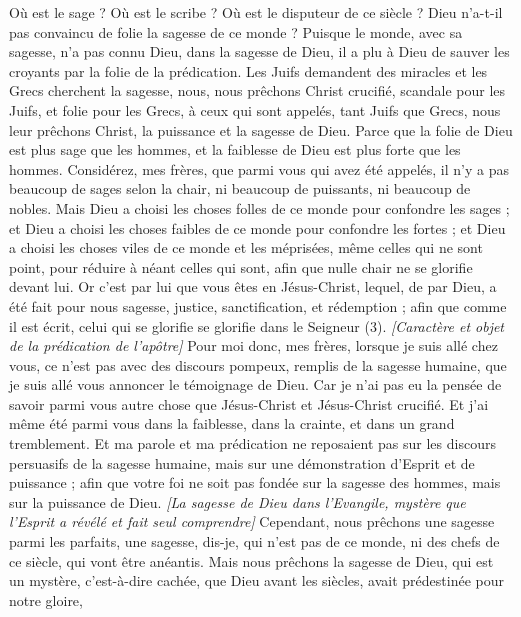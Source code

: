 \begin{multicols}{2}
Où est le sage ? Où est le scribe ? Où est le disputeur de ce siècle ? Dieu n'a-t-il pas convaincu de folie la sagesse de ce monde ?
Puisque le monde, avec sa sagesse, n’a pas connu Dieu, dans la sagesse de Dieu, il a plu à Dieu de sauver les croyants par la folie de la prédication.
Les Juifs demandent des miracles et les Grecs cherchent la sagesse,
nous, nous prêchons Christ crucifié, scandale pour les Juifs, et folie pour les Grecs,
à ceux qui sont appelés, tant Juifs que Grecs, nous leur prêchons Christ, la puissance et la sagesse de Dieu.
Parce que la folie de Dieu est plus sage que les hommes, et la faiblesse de Dieu est plus forte que les hommes.
Considérez, mes frères, que parmi vous qui avez été appelés, il n’y a pas beaucoup de sages selon la chair, ni beaucoup de puissants, ni beaucoup de nobles.
Mais Dieu a choisi les choses folles de ce monde pour confondre les sages ; et Dieu a choisi les choses faibles de ce monde pour confondre les fortes ;
et Dieu a choisi les choses viles de ce monde et les méprisées, même celles qui ne sont point, pour réduire à néant celles qui sont,
afin que nulle chair ne se glorifie devant lui.
Or c'est par lui que vous êtes en Jésus-Christ, lequel, de par Dieu, a été fait pour nous sagesse, justice, sanctification, et rédemption ;
afin que comme il est écrit, celui qui se glorifie se glorifie dans le Seigneur (3).
\textit{[Caractère et objet de la prédication de l'apôtre]}
\VerseOne{}Pour moi donc, mes frères, lorsque je suis allé chez vous, ce n’est pas avec des discours pompeux, remplis de la sagesse humaine, que je suis allé vous annoncer le témoignage de Dieu.
Car je n’ai pas eu la pensée de savoir parmi vous autre chose que Jésus-Christ et Jésus-Christ crucifié.
Et j'ai même été parmi vous dans la faiblesse, dans la crainte, et dans un grand tremblement.
Et ma parole et ma prédication ne reposaient pas sur les discours persuasifs de la sagesse humaine, mais sur une démonstration d'Esprit et de puissance ;
afin que votre foi ne soit pas fondée sur la sagesse des hommes, mais sur la puissance de Dieu.
\textit{[La sagesse de Dieu dans l'Evangile, mystère que l'Esprit a révélé et fait seul comprendre]}
Cependant, nous prêchons une sagesse parmi les parfaits, une sagesse, dis-je, qui n'est pas de ce monde, ni des chefs de ce siècle, qui vont être anéantis.
Mais nous prêchons la sagesse de Dieu, qui est un mystère, c'est-à-dire cachée, que Dieu avant les siècles, avait prédestinée pour notre gloire,

\end{multicols}
